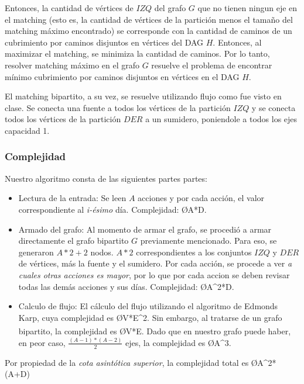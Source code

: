 Entonces, la cantidad de vértices de $IZQ$ del grafo $G$ que no tienen ningun eje en el matching (esto es, la cantidad de vértices de la partición menos el tamaño del matching máximo encontrado) se corresponde con la cantidad de caminos de un cubrimiento por caminos disjuntos en vértices del DAG $H$. Entonces, al maximizar el matching, se minimiza la cantidad de caminos. Por lo tanto, resolver matching máximo en el grafo $G$ resuelve el problema de encontrar mínimo cubrimiento por caminos disjuntos en vértices en el DAG $H$.

El matching bipartito, a su vez, se resuelve utilizando flujo como fue visto en clase. Se conecta una fuente a todos los vértices de la partición $IZQ$ y se conecta todos los vértices de la partición $DER$ a un sumidero, poniendole a todos los ejes capacidad 1.

\subsubsection{Complejidad}
Nuestro algoritmo consta de las siguientes partes partes:
\begin{itemize}
	\item Lectura de la entrada: Se leen $A$ acciones y por cada acción, el valor correspondiente al \emph{i-ésimo} día. Complejidad: \O{A*D}.
	\item Armado del grafo: Al momento de armar el grafo, se procedió a armar directamente el grafo bipartito $G$ previamente mencionado. Para eso, se generaron $A*2+2$ nodos. $A*2$ correspondientes a los conjuntos $IZQ$ y $DER$ de vértices, más la fuente y el sumidero. Por cada acción, se procede a ver \emph{a cuales otras acciones es mayor}, por lo que por cada accion se deben revisar todas las demás acciones y sus días. Complejidad: \O{A^2*D}.
	\item Calculo de flujo: El cálculo del flujo utilizando el algoritmo de Edmonds Karp, cuya complejidad es \O{V*E^2}. Sin embargo, al tratarse de un grafo bipartito, la complejidad es \O{V*E}\textsuperscript{\cite{cormen}}. Dado que en nuestro grafo puede haber, en peor caso, $\frac{(A-1)*(A-2)}{2}$ ejes, la complejidad es \O{A^3}.
\end{itemize}

Por propiedad de la \emph{cota asintótica superior}, la complejidad total es
\O{A^2*(A+D)}